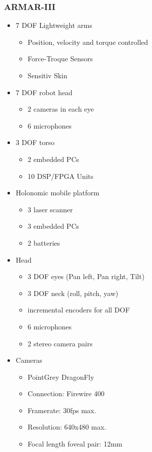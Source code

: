 \subsubsection{ARMAR-III} %
\begin{itemize}
	\item 7 DOF Lightweight arms
	\begin{itemize}
		\item Position, velocity and torque controlled
		\item Force-Troque Sensors
		\item Sensitiv Skin
	\end{itemize}
	\item 7 DOF robot head
	\begin{itemize}
		\item 2 cameras in each eye
		\item 6 microphones
	\end{itemize}
	\item 3 DOF torso
	\begin{itemize}
		\item 2 embedded PCs
		\item 10 DSP/FPGA Units
	\end{itemize}
	\item Holonomic mobile platform
	\begin{itemize}
		\item 3 laser scanner
		\item 3 embedded PCs
		\item 2 batteries
	\end{itemize}
	\item Head
	\begin{itemize}
		\item 3 DOF eyes (Pan left, Pan right, Tilt)
		\item 3 DOF neck (roll, pitch, yaw)
		\item incremental encoders for all DOF
		\item 6 microphones
		\item 2 stereo camera pairs
	\end{itemize}
	\item Cameras
	\begin{itemize}
		\item PointGrey DragonFly
		\item Connection: Firewire 400
		\item Framerate: 30fps max.
		\item Resolution: 640x480 max.
		\item Focal length foveal pair: 12mm

\end{itemize}
\end{itemize}

